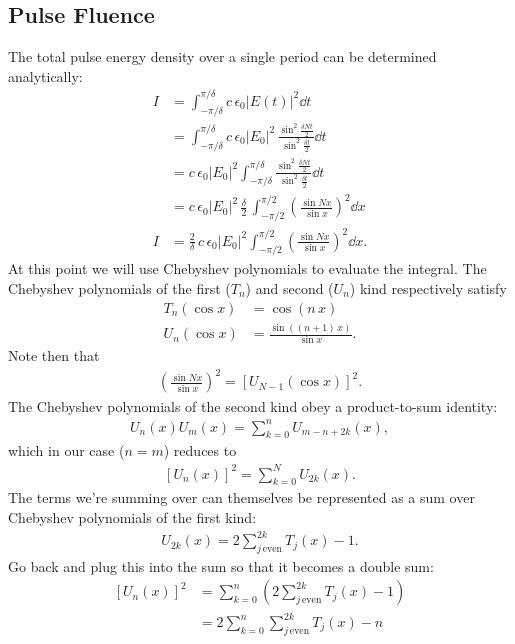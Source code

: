 \documentclass[12pt]{article}
\newcommand{\Tn}[2]{T_{#1}\left(#2\right)}
\newcommand{\Un}[2]{U_{#1}\left(#2\right)}
\numberwithin{equation}{section}
\begin{document}
\subsection{Pulse Fluence}
The total pulse energy density over a single period can be determined analytically:
\begin{align*}
I &= \int_{-\pi/\delta}^{\pi/\delta} c \, \epsilon_0 |E(t)|^2 \dd{t} \\
&= \int_{-\pi/\delta}^{\pi/\delta} c \, \epsilon_0 |E_0|^2 \, \frac{\sin^2{\frac{\delta N t}{2}}}{\sin^2{\frac{\delta t}{2}}} \dd{t} \\
&= c \, \epsilon_0 |E_0|^2 \int_{-\pi/\delta}^{\pi/\delta} \frac{\sin^2{\frac{\delta N t}{2}}}{\sin^2{\frac{\delta t}{2}}} \dd{t} \\
&= c \, \epsilon_0 |E_0|^2 \, \frac{\delta}{2} \, \int_{-\pi/2}^{\pi/2} \left(\frac{\sin Nx}{\sin x}\right)^2 \dd{x} \\
I &= \frac{2}{\delta} \, c \, \epsilon_0 |E_0|^2 \int_{-\pi/2}^{\pi/2} \left(\frac{\sin Nx}{\sin x}\right)^2 \dd{x}.
\end{align*}
At this point we will use Chebyshev polynomials to evaluate the integral. The Chebyshev polynomials of the first ($T_n$) and second ($U_n$) kind respectively satisfy
\begin{align*}
\Tn{n}{\cos x} &= \cos(n \, x) \\
\Un{n}{\cos x} &= \frac{\sin((n+1) \, x)}{\sin x}.
\end{align*}
Note then that
\begin{align*}
\left(\frac{\sin Nx}{\sin x}\right)^2 = \left[\Un{N-1}{\cos x}\right]^2.
\end{align*}
The Chebyshev polynomials of the second kind obey a product-to-sum identity:
\begin{align*}
\Un{n}{x} \Un{m}{x} = \sum_{k=0}^{n} \Un{m-n+2k}{x},
\end{align*}
which in our case ($n=m$) reduces to
\begin{align*}
\left[\Un{n}{x}\right]^2 = \sum_{k=0}^{N} \Un{2k}{x}.
\end{align*}
The terms we're summing over can themselves be represented as a sum over Chebyshev polynomials of the first kind:
\begin{align*}
\Un{2k}{x} = 2 \sum_{j \, \mathrm{even}}^{2k} \Tn{j}{x} - 1.
\end{align*}
Go back and plug this into the sum so that it becomes a double sum:
\begin{align*}
\left[\Un{n}{x}\right]^2 &= \sum_{k=0}^{n} \left(2 \sum_{j \, \mathrm{even}}^{2k} \Tn{j}{x} - 1\right) \\
&= 2 \sum_{k=0}^{n} \sum_{j \, \mathrm{even}}^{2k} \Tn{j}{x} - n
\end{align*}
\end{document}

